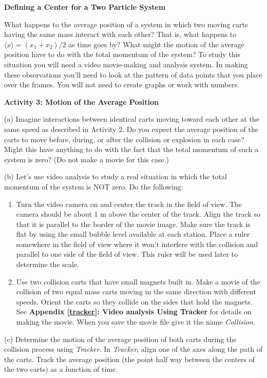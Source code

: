 \textbf{Defining a Center for a Two Particle System }

What happens to the average position of a system in which two moving carts having
the same mass interact with each other? That is, what happens to 
\(\langle x\rangle = (x_{1} 
+ x_{2} )/2\) as time goes by? What might the motion of the average position
have to do with the total momentum of the system? To study this situation you
will need a video movie-making and analysis system. In making these observations
you'll need to look at the pattern of data points that you place over the frames.
You will not need to create graphs or work with numbers. 

\textbf{Activity 3: Motion of the Average Position} 

(a) Imagine interactions between identical carts moving toward each other at
the same speed as described in Activity 2. Do you expect the average position
of the carts to move before, during, or after the collision or explosion in
each case? Might this have anything to do with the fact that the total momentum
of such a system is zero? (Do not make a movie for this case.)
\answerspace{20mm}

(b) Let's use video analysis to study a real situation in which the total momentum of the system is NOT zero. Do the following: 

\begin{enumerate}
\item Turn the video camera on and center the track in the field of view. The camera
should be about 1 m above the center of the track. Align the track so that it
is parallel to the border of the movie image. Make sure the track is flat by
using the small bubble level available at each station. Place a ruler somewhere in
the field of view where it won't interfere with the collision and parallel to
one side of the field of view. This ruler will be used later to determine the
scale. 
\item Use two collision carts that have small magnets built in. Make a movie of the
collision of two equal mass carts moving in the same direction with different
speeds. Orient the carts so they collide on the sides that hold the magnets.
See \textbf{Appendix \ref{tracker}: Video analysis Using Tracker} for details on making the movie. When
you save the movie file give it the name \textit{Collision}. 
\end{enumerate}
(c) Determine the motion of the average position of both carts during the collision process 
using \textit{Tracker}. In \textit{Tracker}, align one of the axes along the path of the carts. 
Track the average position (the point half way between the centers of the two carts) as a function 
of time.


